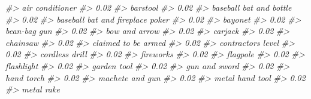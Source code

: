 \documentclass[
]{krantz}
\makeatletter
\newenvironment{Shaded}{\begin{snugshade}}{\end{snugshade}}
\newcommand{\CommentTok}[1]{\textcolor[rgb]{0.37,0.37,0.37}{\textit{#1}}}
\newenvironment{kframe}{%
\medskip{}
\setlength{\fboxsep}{.8em}
 \def\at@end@of@kframe{}%
 \ifinner\ifhmode%
  \def\at@end@of@kframe{\end{minipage}}%
  \begin{minipage}{\columnwidth}%
 \fi\fi%
 \def\FrameCommand##1{\hskip\@totalleftmargin \hskip-\fboxsep
 \colorbox{shadecolor}{##1}\hskip-\fboxsep
     \hskip-\linewidth \hskip-\@totalleftmargin \hskip\columnwidth}%
 \MakeFramed {\advance\hsize-\width
   \@totalleftmargin\z@ \linewidth\hsize
   \@setminipage}}%
 {\par\unskip\endMakeFramed%
 \at@end@of@kframe}
\renewenvironment{Shaded}{\begin{kframe}}{\end{kframe}}
\makeatother
\begin{document}
\begin{Shaded}
\begin{Highlighting}[]
\CommentTok{\#\textgreater{}                  air conditioner }
\CommentTok{\#\textgreater{}                             0.02 }
\CommentTok{\#\textgreater{}                         barstool }
\CommentTok{\#\textgreater{}                             0.02 }
\CommentTok{\#\textgreater{}          baseball bat and bottle }
\CommentTok{\#\textgreater{}                             0.02 }
\CommentTok{\#\textgreater{} baseball bat and fireplace poker }
\CommentTok{\#\textgreater{}                             0.02 }
\CommentTok{\#\textgreater{}                          bayonet }
\CommentTok{\#\textgreater{}                             0.02 }
\CommentTok{\#\textgreater{}                     bean{-}bag gun }
\CommentTok{\#\textgreater{}                             0.02 }
\CommentTok{\#\textgreater{}                    bow and arrow }
\CommentTok{\#\textgreater{}                             0.02 }
\CommentTok{\#\textgreater{}                          carjack }
\CommentTok{\#\textgreater{}                             0.02 }
\CommentTok{\#\textgreater{}                         chainsaw }
\CommentTok{\#\textgreater{}                             0.02 }
\CommentTok{\#\textgreater{}              claimed to be armed }
\CommentTok{\#\textgreater{}                             0.02 }
\CommentTok{\#\textgreater{}               contractor\textquotesingle{}s level }
\CommentTok{\#\textgreater{}                             0.02 }
\CommentTok{\#\textgreater{}                   cordless drill }
\CommentTok{\#\textgreater{}                             0.02 }
\CommentTok{\#\textgreater{}                        fireworks }
\CommentTok{\#\textgreater{}                             0.02 }
\CommentTok{\#\textgreater{}                         flagpole }
\CommentTok{\#\textgreater{}                             0.02 }
\CommentTok{\#\textgreater{}                       flashlight }
\CommentTok{\#\textgreater{}                             0.02 }
\CommentTok{\#\textgreater{}                      garden tool }
\CommentTok{\#\textgreater{}                             0.02 }
\CommentTok{\#\textgreater{}                    gun and sword }
\CommentTok{\#\textgreater{}                             0.02 }
\CommentTok{\#\textgreater{}                       hand torch }
\CommentTok{\#\textgreater{}                             0.02 }
\CommentTok{\#\textgreater{}                  machete and gun }
\CommentTok{\#\textgreater{}                             0.02 }
\CommentTok{\#\textgreater{}                  metal hand tool }
\CommentTok{\#\textgreater{}                             0.02 }
\CommentTok{\#\textgreater{}                       metal rake }

\end{Highlighting}
\end{Shaded}
\end{document}

